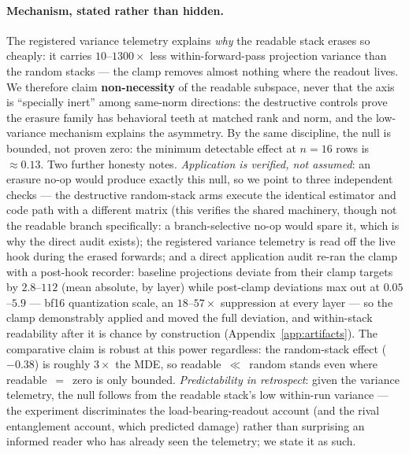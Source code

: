 \documentclass{article} %
\begin{document}
\paragraph{Mechanism, stated rather than hidden.} The registered
variance telemetry explains \emph{why} the readable stack erases so
cheaply: it carries $10$--$1300\times$ less within-forward-pass
projection variance than the random stacks --- the clamp removes almost
nothing where the readout lives. We therefore claim
\textbf{non-necessity} of the readable subspace, never that the axis is
``specially inert'' among same-norm directions: the destructive
controls prove the erasure family has behavioral teeth at matched rank
and norm, and the low-variance mechanism explains the asymmetry. By the
same discipline, the null is bounded, not proven zero: the minimum
detectable effect at $n{=}16$ rows is $\approx 0.13$. Two further
honesty notes. \emph{Application is verified, not assumed}: an
erasure no-op would produce exactly this null, so we point to three
independent checks --- the destructive random-stack arms execute the
identical estimator and code path with a different matrix (this
verifies the shared machinery, though not the readable branch
specifically: a branch-selective no-op would spare it, which is why
the direct audit exists); the registered variance telemetry is read
off the live hook during the erased forwards; and a direct
application audit re-ran the clamp with a post-hook recorder:
baseline projections deviate from their clamp targets by $2.8$--$112$
(mean absolute, by layer) while post-clamp deviations max out at
$0.05$--$5.9$ --- bf16 quantization scale, an $18$--$57\times$
suppression at every layer --- so the clamp demonstrably applied and
moved the full deviation, and within-stack readability after it is
chance by construction (Appendix~\ref{app:artifacts}). The comparative claim is robust at
this power regardless: the random-stack effect ($-0.38$) is roughly
$3\times$ the MDE, so readable~$\ll$~random stands even where
readable~$=$~zero is only bounded. \emph{Predictability in retrospect}:
given the variance telemetry, the null follows from the readable
stack's low within-run variance --- the experiment discriminates the
load-bearing-readout account (and the rival entanglement account,
which predicted damage) rather than surprising an informed reader who
has already seen the telemetry; we state it as such.
\end{document}
